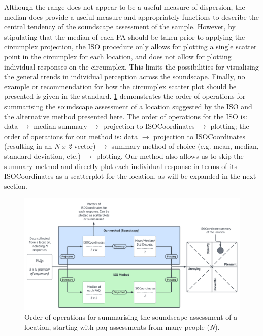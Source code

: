 Although the range does not appear to be a useful measure of dispersion, the median does provide a useful measure and appropriately functions to describe the central tendency of the  soundscape assessment of the sample. However, by stipulating that the median of each PA should be taken prior to applying the circumplex projection, the ISO procedure only allows for plotting a single scatter point in the circumplex for each location, and does not allow for plotting individual responses on the circumplex. This limits the possibilities for visualising the general trends in individual perception across the soundscape. Finally, no example or recommendation for how the circumplex scatter plot should be presented is given in the standard. \cref{fig:summaryMethods} demonstrates the order of operations for summarising the soundscape assessment of a location suggested by the ISO and the alternative method presented here. The order of operations for the ISO is: data $\rightarrow$ median summary $\rightarrow$ projection to ISOCoordinates $\rightarrow$ plotting; the order of operations for our method is: data $\rightarrow$ projection to ISOCoordinates (resulting in an \emph{N x 2} vector) $\rightarrow$ summary method of choice (e.g. mean, median, standard deviation, etc.) $\rightarrow$ plotting. Our method also allows us to skip the summary method and directly plot each individual response in terms of its ISOCoordinates as a scatterplot for the location, as will be expanded in the next section.

\begin{figure}
  \centering
  \includegraphics[width=\textwidth]{Figures/SummaryMethodDiagram.png}
  \caption{Order of operations for summarising the soundscape assessment of a location, starting with \gls{paq} assessments from many people (\emph{N}). \label{fig:summaryMethods}}
\end{figure}

